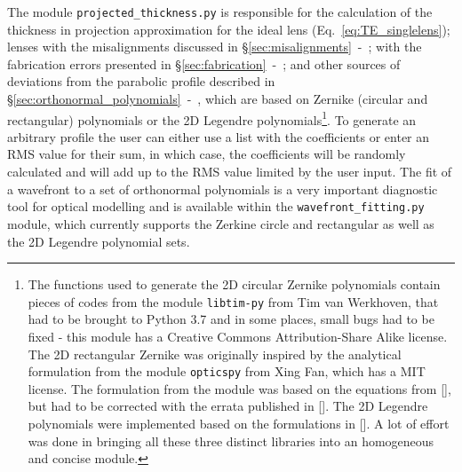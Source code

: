 \begin{refsection}
The module \texttt{projected\_thickness.py} is responsible for the calculation of the thickness in projection approximation for the ideal lens (Eq.~\ref{eq:TE_singlelens}); lenses with the misalignments discussed in \S\ref{sec:misalignments}~-~\textit{}; with the fabrication errors presented in \S\ref{sec:fabrication}~-~\textit{}; and other sources of deviations from the parabolic profile described in \S\ref{sec:orthonormal_polynomials}~-~\textit{}, which are based on Zernike (circular and rectangular) polynomials or the 2D Legendre polynomials\footnote{The functions used to generate the 2D circular Zernike polynomials contain pieces of codes from the module \texttt{libtim-py} from Tim van Werkhoven, that had to be brought to Python 3.7 and in some places, small bugs had to be fixed - this module has a Creative Commons Attribution-Share Alike
license. The 2D rectangular Zernike was originally inspired by the analytical formulation from the module \texttt{opticspy} from Xing Fan, which has a MIT license. The formulation from the module was based on the equations from [\cite{Mahajan2007}], but had to be corrected with the errata published in [\cite{Mahajan2012}]. The 2D Legendre polynomials were implemented based on the formulations in [\cite{Mahajan2010}]. A lot of effort was done in bringing all these three distinct libraries into an homogeneous and concise module.}. To generate an arbitrary profile the user can either use a list with the coefficients or enter an RMS value for their sum, in which case, the coefficients will be randomly calculated and will add up to the RMS value limited by the user input. The fit of a wavefront to a set of orthonormal polynomials is a very important diagnostic tool for optical modelling and is available within the \texttt{wavefront\_fitting.py} module, which currently supports the Zerkine circle and rectangular as well as the 2D Legendre polynomial sets.


\end{refsection}
